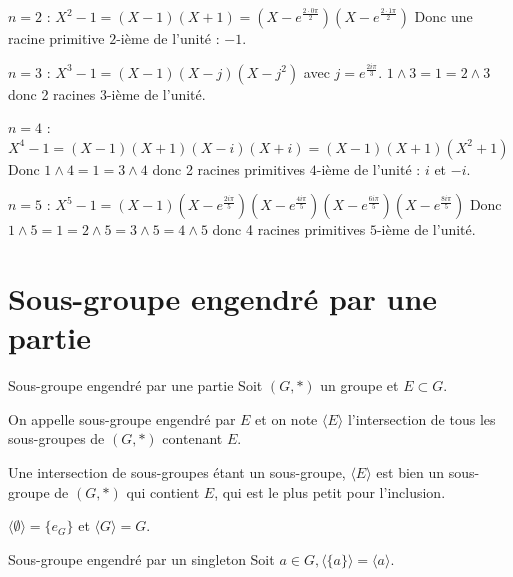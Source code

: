\begin{exemple}
    $n = 2$ : $X^2 - 1 = (X - 1)(X + 1) = (X - e^{\frac{2 \cdot 0 \pi} 2})(X - e^{\frac{2 \cdot 1 \pi}2})$
    Donc une racine primitive $2$-ième de l'unité : $-1$.
    
    \avspace $n = 3$ : $X^3 - 1 = (X - 1)(X - j)(X - j^2)$ avec $j = e^{\frac{2i\pi}3}$.
    $1 \wedge 3 = 1 = 2 \wedge 3$ donc 2 racines $3$-ième de l'unité.

    \avspace $n = 4$ : $X^4 - 1 = (X - 1)(X + 1)(X - i)(X + i) = (X - 1)(X + 1)(X^2 + 1)$
    Donc $1 \wedge 4 = 1 = 3 \wedge 4$ donc 2 racines primitives $4$-ième de l'unité : $i$ et $-i$.
    
    \avspace $n = 5$ : $X^5 - 1 = (X - 1)(X - e^{\frac{2i\pi}5})(X - e^{\frac{4i\pi}5})(X - e^{\frac{6i\pi}5})(X - e^{\frac{8i\pi}5})$
    Donc $1 \wedge 5 = 1 = 2 \wedge 5 = 3 \wedge 5 = 4 \wedge 5$ donc 4 racines primitives $5$-ième de l'unité.


\end{exemple}

\section{Sous-groupe engendré par une partie }

\begin{definition}{Sous-groupe engendré par une partie}{}
    Soit $(G, \ast)$ un groupe et $E \subset G$.

    On appelle sous-groupe engendré par $E$ et on note $\langle E \rangle$
    l'intersection de tous les sous-groupes de $(G, \ast)$ contenant $E$.
\end{definition}

\begin{remarque}
    Une intersection de sous-groupes étant un sous-groupe, $\langle E \rangle$ est bien un sous-groupe de $(G, \ast)$
    qui contient $E$, qui est le plus petit pour l'inclusion.
\end{remarque}

\begin{exemple}
    $\langle \emptyset \rangle = \{e_G\}$ et $\langle G \rangle = G$.
\end{exemple}

\begin{proposition}{Sous-groupe engendré par un singleton}{}
    Soit $a \in G, \langle \{a\} \rangle = \langle a \rangle$.
\end{proposition}

